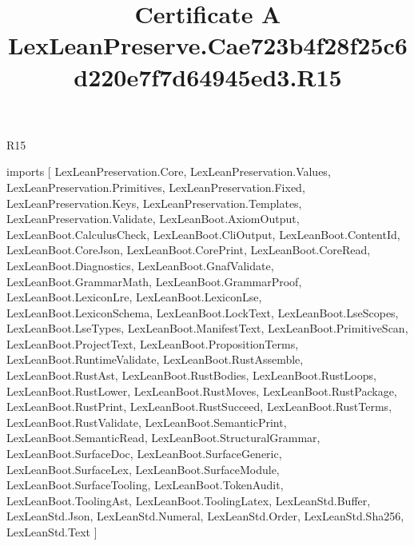 \begin{lexlean}{R15}
\title{Certificate A LexLeanPreserve.Cae723b4f28f25c6d220e7f7d64945ed3.R15}
\begin{coremodule}
imports [
  LexLeanPreservation.Core,
  LexLeanPreservation.Values,
  LexLeanPreservation.Primitives,
  LexLeanPreservation.Fixed,
  LexLeanPreservation.Keys,
  LexLeanPreservation.Templates,
  LexLeanPreservation.Validate,
  LexLeanBoot.AxiomOutput,
  LexLeanBoot.CalculusCheck,
  LexLeanBoot.CliOutput,
  LexLeanBoot.ContentId,
  LexLeanBoot.CoreJson,
  LexLeanBoot.CorePrint,
  LexLeanBoot.CoreRead,
  LexLeanBoot.Diagnostics,
  LexLeanBoot.GnafValidate,
  LexLeanBoot.GrammarMath,
  LexLeanBoot.GrammarProof,
  LexLeanBoot.LexiconLre,
  LexLeanBoot.LexiconLse,
  LexLeanBoot.LexiconSchema,
  LexLeanBoot.LockText,
  LexLeanBoot.LseScopes,
  LexLeanBoot.LseTypes,
  LexLeanBoot.ManifestText,
  LexLeanBoot.PrimitiveScan,
  LexLeanBoot.ProjectText,
  LexLeanBoot.PropositionTerms,
  LexLeanBoot.RuntimeValidate,
  LexLeanBoot.RustAssemble,
  LexLeanBoot.RustAst,
  LexLeanBoot.RustBodies,
  LexLeanBoot.RustLoops,
  LexLeanBoot.RustLower,
  LexLeanBoot.RustMoves,
  LexLeanBoot.RustPackage,
  LexLeanBoot.RustPrint,
  LexLeanBoot.RustSucceed,
  LexLeanBoot.RustTerms,
  LexLeanBoot.RustValidate,
  LexLeanBoot.SemanticPrint,
  LexLeanBoot.SemanticRead,
  LexLeanBoot.StructuralGrammar,
  LexLeanBoot.SurfaceDoc,
  LexLeanBoot.SurfaceGeneric,
  LexLeanBoot.SurfaceLex,
  LexLeanBoot.SurfaceModule,
  LexLeanBoot.SurfaceTooling,
  LexLeanBoot.TokenAudit,
  LexLeanBoot.ToolingAst,
  LexLeanBoot.ToolingLatex,
  LexLeanStd.Buffer,
  LexLeanStd.Json,
  LexLeanStd.Numeral,
  LexLeanStd.Order,
  LexLeanStd.Sha256,
  LexLeanStd.Text
]


\end{coremodule}
\end{lexlean}

